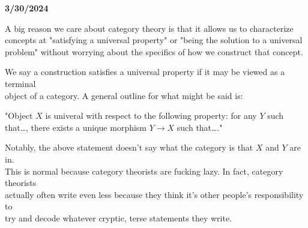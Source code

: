 \documentclass{book}
\newcommand{\hTwo}{%
   \color{MidnightBlue}%
   \fontsize{13}{15}\selectfont%
}
\newenvironment{myIndent}{%
   \begin{adjustwidth}{2.5em}{0em}%
}{%
   \end{adjustwidth}%
}
\newcommand*{\markDate}[1]{%
   {\huge \color{Black} \textbf{#1} \newline}%
}
\newcommand{\retTwo}{\hfill\bigbreak}
\begin{document}
\markDate{3/30/2024}

A big reason we care about category theory is that it allows us to characterize\\ concepts at "satisfying a universal property" or "being the solution to a universal\\ problem" without worrying about the specifics of how we construct that concept.\retTwo

We say a construction satisfies a universal property if it may be viewed as a terminal\\ object of a category. A general outline for what might be said is:
{\begin{myIndent}\hTwo
   "Object $X$ is univeral with respect to the following property: for any $Y$ such that\dots, there exists a unique morphism $Y \rightarrow X$ such that\dots."\retTwo
\end{myIndent}}

Notably, the above statement doesn't say what the category is that $X$ and $Y$ are in.\\ This is normal because category theorists are fucking lazy. In fact, category theorists\\ actually often write even less because they think it's other people's responsibility to\\ try and decode whatever cryptic, terse statements they write.\retTwo
\end{document}
